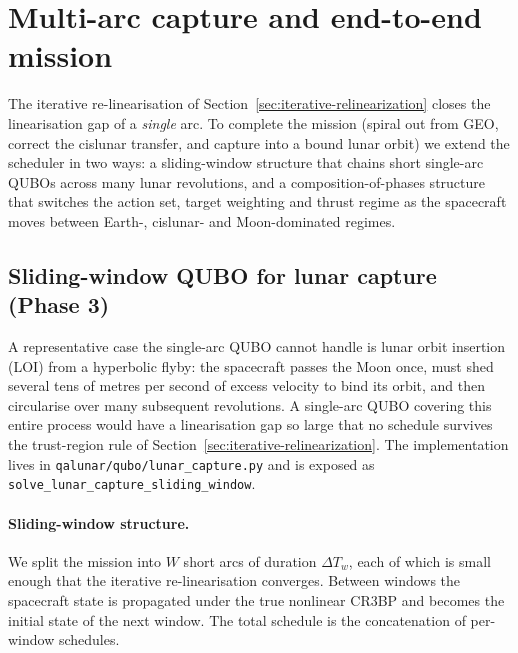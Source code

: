 \documentclass[8pt,a4paper]{article}
\theoremstyle{definition}
\theoremstyle{remark}
\begin{document}
\section{Multi-arc capture and end-to-end mission}\label{sec:multi-arc}

The iterative re-linearisation of
Section~\ref{sec:iterative-relinearization} closes the
linearisation gap of a \emph{single} arc. To complete the mission
(spiral out from GEO, correct the cislunar transfer, and capture
into a bound lunar orbit) we extend the scheduler in two ways:
a sliding-window structure that chains short single-arc QUBOs
across many lunar revolutions, and a composition-of-phases
structure that switches the action set, target weighting and
thrust regime as the spacecraft moves between Earth-, cislunar-
and Moon-dominated regimes.

\subsection{Sliding-window QUBO for lunar capture (Phase 3)}\label{sec:sliding-window}

A representative case the single-arc QUBO cannot handle is lunar
orbit insertion (LOI) from a hyperbolic flyby: the spacecraft
passes the Moon once, must shed several tens of metres per second
of excess velocity to bind its orbit, and then circularise over
many subsequent revolutions. A single-arc QUBO covering this entire
process would have a linearisation gap so large that no schedule
survives the trust-region rule of
Section~\ref{sec:iterative-relinearization}. The implementation
lives in \texttt{qalunar/qubo/lunar\_capture.py} and is exposed as
\texttt{solve\_lunar\_capture\_sliding\_window}.

\paragraph{Sliding-window structure.} We split the mission into $W$
short arcs of duration $\Delta T_w$, each of which is small enough
that the iterative re-linearisation converges. Between windows the
spacecraft state is propagated under the true nonlinear CR3BP and
becomes the initial state of the next window. The total schedule
is the concatenation of per-window schedules.
\end{document}
